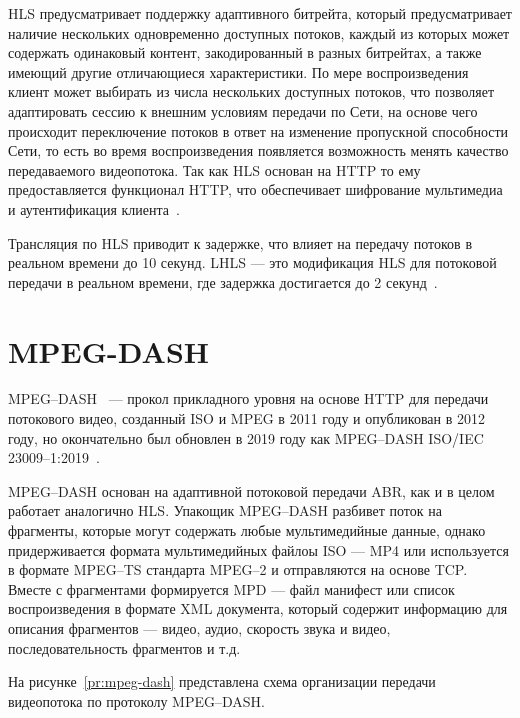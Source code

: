 HLS предусматривает поддержку адаптивного битрейта, который предусматривает наличие нескольких одновременно доступных потоков, каждый из которых может содержать одинаковый контент, закодированный в разных битрейтах, а также имеющий другие отличающиеся характеристики. 
По мере воспроизведения клиент может выбирать из числа нескольких доступных потоков, что позволяет адаптировать сессию к внешним условиям передачи по Сети, на основе чего происходит переключение потоков в ответ на изменение пропускной способности Сети, то есть во время воспроизведения появляется возможность менять качество передаваемого видеопотока. 
Так как HLS основан на HTTP то ему предоставляется функционал HTTP, что обеспечивает шифрование мультимедиа и аутентификация клиента~\cite{hls_apple}.

Трансляция по HLS приводит к задержке, что влияет на передачу потоков в реальном времени до 10 секунд.
LHLS --- это модификация HLS для потоковой передачи в реальном времени, где задержка достигается до 2 секунд~\cite{hls_apple}. 

\section{MPEG-DASH}

MPEG--DASH~\cite{mpeg-dash-2012} --- прокол прикладного уровня на основе HTTP для передачи потокового видео, созданный ISO и MPEG в 2011 году и опубликован в 2012 году, но окончательно был обновлен в 2019 году как MPEG--DASH ISO/IEC 23009--1:2019~\cite{mpeg-dash-2019}.
 
\clearpage 
 
MPEG--DASH основан на адаптивной потоковой передачи ABR, как и в целом работает аналогично HLS.
Упакощик MPEG--DASH разбивет поток на фрагменты, которые могут содержать любые мультимедийные данные, однако придерживается формата мультимедийных файлоы  ISO --- MP4 или используется в формате MPEG--TS стандарта MPEG--2 и отправляются на основе TCP.
Вместе с фрагментами формируется MPD --- файл манифест или список воспроизведения в формате XML документа, который содержит информацию для описания фрагментов --- видео, аудио, скорость звука и видео, последовательность фрагментов и т.д. 

На рисунке~\ref{pr:mpeg-dash} представлена схема организации передачи видеопотока по протоколу MPEG--DASH.  

